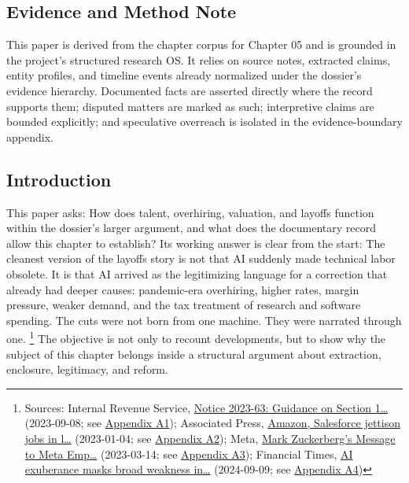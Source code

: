 \documentclass[
  american,
  11pt,
  letterpaper,
]{article}
\begin{document}
\subsection{Evidence and Method Note}\label{evidence-and-method-note-5}

This paper is derived from the chapter corpus for Chapter 05 and is
grounded in the project's structured research OS. It relies on source
notes, extracted claims, entity profiles, and timeline events already
normalized under the dossier's evidence hierarchy. Documented facts are
asserted directly where the record supports them; disputed matters are
marked as such; interpretive claims are bounded explicitly; and
speculative overreach is isolated in the evidence-boundary appendix.

\subsection{Introduction}\label{introduction-5}

This paper asks: How does talent, overhiring, valuation, and layoffs
function within the dossier's larger argument, and what does the
documentary record allow this chapter to establish? Its working answer
is clear from the start: The cleanest version of the layoffs story is
not that AI suddenly made technical labor obsolete. It is that AI
arrived as the legitimizing language for a correction that already had
deeper causes: pandemic-era overhiring, higher rates, margin pressure,
weaker demand, and the tax treatment of research and software spending.
The cuts were not born from one machine. They were narrated through one.
\footnote{Sources: Internal Revenue Service,
  \href{https://www.irs.gov/pub/irs-drop/n-23-63.pdf}{Notice 2023-63:
  Guidance on Section 1\ldots{}} (2023-09-08; see
  \hyperref[ch-05-appendix-a1-notice-2023-63-guidance-on-section-174-and-specified-research-or-experimental-expenditures]{Appendix
  A1}); Associated Press,
  \href{https://apnews.com/article/bbb2f3a09eafdfc7cda54a3b87e538ad}{Amazon,
  Salesforce jettison jobs in l\ldots{}} (2023-01-04; see
  \hyperref[ch-05-appendix-a2-amazon-salesforce-jettison-jobs-in-latest-tech-worker-purge]{Appendix
  A2}); Meta,
  \href{https://about.fb.com/news/2023/03/mark-zuckerberg-meta-year-of-efficiency/}{Mark
  Zuckerberg's Message to Meta Emp\ldots{}} (2023-03-14; see
  \hyperref[ch-05-appendix-a3-mark-zuckerberg-s-message-to-meta-employees]{Appendix
  A3}); Financial Times,
  \href{https://www.ft.com/content/0b14d871-2d19-46f1-9660-5466301e8066}{AI
  exuberance masks broad weakness in\ldots{}} (2024-09-09; see
  \hyperref[ch-05-appendix-a4-ai-exuberance-masks-broad-weakness-in-tech-sector-say-investors]{Appendix
  A4})} The objective is not only to recount developments, but to show
why the subject of this chapter belongs inside a structural argument
about extraction, enclosure, legitimacy, and reform.
\end{document}
